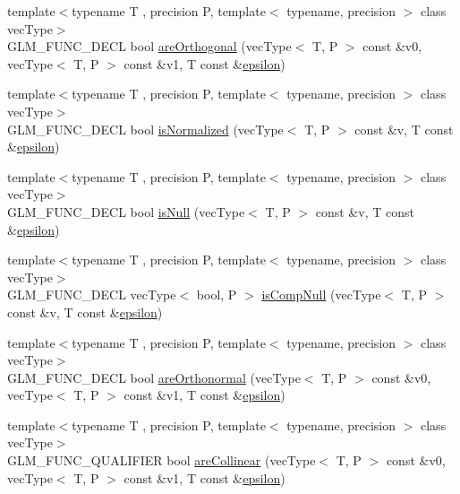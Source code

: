\begin{DoxyCompactItemize}
\item 
{\footnotesize template$<$typename T , precision P, template$<$ typename, precision $>$ class vec\+Type$>$ }\\G\+L\+M\+\_\+\+F\+U\+N\+C\+\_\+\+D\+E\+C\+L bool \hyperlink{group__gtx__vector__query_gaee10acefed397c11e01f2862e837754c}{are\+Orthogonal} (vec\+Type$<$ T, P $>$ const \&v0, vec\+Type$<$ T, P $>$ const \&v1, T const \&\hyperlink{group__gtc__constants_ga2a1e57fc5592b69cfae84174cbfc9429}{epsilon})
\item 
{\footnotesize template$<$typename T , precision P, template$<$ typename, precision $>$ class vec\+Type$>$ }\\G\+L\+M\+\_\+\+F\+U\+N\+C\+\_\+\+D\+E\+C\+L bool \hyperlink{group__gtx__vector__query_ga6fa5fa2af67d14c205d24c49aad03270}{is\+Normalized} (vec\+Type$<$ T, P $>$ const \&v, T const \&\hyperlink{group__gtc__constants_ga2a1e57fc5592b69cfae84174cbfc9429}{epsilon})
\item 
{\footnotesize template$<$typename T , precision P, template$<$ typename, precision $>$ class vec\+Type$>$ }\\G\+L\+M\+\_\+\+F\+U\+N\+C\+\_\+\+D\+E\+C\+L bool \hyperlink{group__gtx__vector__query_ga81a64edc1a2b470b82896592e89c523b}{is\+Null} (vec\+Type$<$ T, P $>$ const \&v, T const \&\hyperlink{group__gtc__constants_ga2a1e57fc5592b69cfae84174cbfc9429}{epsilon})
\item 
{\footnotesize template$<$typename T , precision P, template$<$ typename, precision $>$ class vec\+Type$>$ }\\G\+L\+M\+\_\+\+F\+U\+N\+C\+\_\+\+D\+E\+C\+L vec\+Type$<$ bool, P $>$ \hyperlink{group__gtx__vector__query_ga93ecd4137480483ce1af0de8bbbf6546}{is\+Comp\+Null} (vec\+Type$<$ T, P $>$ const \&v, T const \&\hyperlink{group__gtc__constants_ga2a1e57fc5592b69cfae84174cbfc9429}{epsilon})
\item 
{\footnotesize template$<$typename T , precision P, template$<$ typename, precision $>$ class vec\+Type$>$ }\\G\+L\+M\+\_\+\+F\+U\+N\+C\+\_\+\+D\+E\+C\+L bool \hyperlink{group__gtx__vector__query_ga89c82bc60e5b84e4489b74c15a134caf}{are\+Orthonormal} (vec\+Type$<$ T, P $>$ const \&v0, vec\+Type$<$ T, P $>$ const \&v1, T const \&\hyperlink{group__gtc__constants_ga2a1e57fc5592b69cfae84174cbfc9429}{epsilon})
\item 
{\footnotesize template$<$typename T , precision P, template$<$ typename, precision $>$ class vec\+Type$>$ }\\G\+L\+M\+\_\+\+F\+U\+N\+C\+\_\+\+Q\+U\+A\+L\+I\+F\+I\+E\+R bool \hyperlink{group__gtx__vector__query_ga465b844190d1740051e45d780832ea4c}{are\+Collinear} (vec\+Type$<$ T, P $>$ const \&v0, vec\+Type$<$ T, P $>$ const \&v1, T const \&\hyperlink{group__gtc__constants_ga2a1e57fc5592b69cfae84174cbfc9429}{epsilon})

\end{DoxyCompactItemize}
